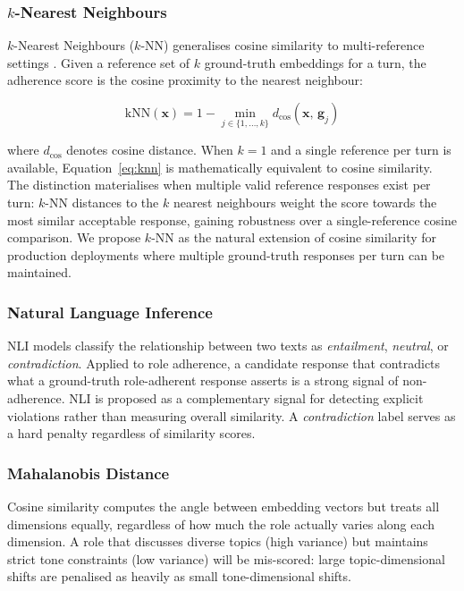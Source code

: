 \documentclass[11pt,a4paper]{article}
\begin{document}
\subsubsection{$k$-Nearest Neighbours}

$k$-Nearest Neighbours ($k$-NN) generalises cosine similarity to
multi-reference settings \citep{cover1967nearest}. Given a reference set of
$k$ ground-truth embeddings for a turn, the adherence score is the cosine
proximity to the nearest neighbour:

\begin{equation}
  \text{kNN}(\mathbf{x}) = 1 - \min_{j \in \{1,\ldots,k\}} d_{\cos}(\mathbf{x},\, \mathbf{g}_j)
  \label{eq:knn}
\end{equation}

where $d_{\cos}$ denotes cosine distance. When $k = 1$ and a single reference
per turn is available, Equation~\ref{eq:knn} is mathematically equivalent to
cosine similarity. The distinction materialises when multiple valid reference
responses exist per turn: $k$-NN distances to the $k$ nearest neighbours weight
the score towards the most similar acceptable response, gaining robustness over
a single-reference cosine comparison. We propose $k$-NN as the natural
extension of cosine similarity for production deployments where multiple
ground-truth responses per turn can be maintained.

\subsubsection{Natural Language Inference}

NLI models \citep{bowman2015snli} classify the relationship between two texts
as \emph{entailment}, \emph{neutral}, or \emph{contradiction}. Applied to role
adherence, a candidate response that contradicts what a ground-truth
role-adherent response asserts is a strong signal of non-adherence. NLI is
proposed as a complementary signal for detecting explicit violations rather
than measuring overall similarity. A \emph{contradiction} label serves as a
hard penalty regardless of similarity scores.

\subsubsection{Mahalanobis Distance}

Cosine similarity computes the angle between embedding vectors but treats all
dimensions equally, regardless of how much the role actually varies along each
dimension. A role that discusses diverse topics (high variance) but maintains
strict tone constraints (low variance) will be mis-scored: large
topic-dimensional shifts are penalised as heavily as small tone-dimensional
shifts.
\end{document}
